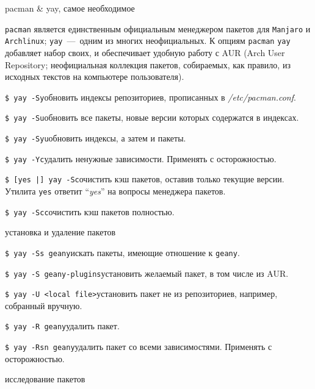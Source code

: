 \documentclass[
a4paper
,11pt
,landscape
,russian
,twocolumn
]{letter}
\newcommand\hsp{\hspace{.2in}}
\newcommand\vsp{\vspace{.2in}}
\begin{document}
\thispagestyle{empty}

\begin{Large}
	pacman \& yay, самое необходимое
\end{Large}

\vsp

\texttt{pacman} является единственным официальным менеджером пакетов для
\texttt{Manjaro} и \texttt{Archlinux}; \texttt{yay}~---~одним из многих
неофициальных.
К опциям \texttt{pacman} \texttt{yay} добавляет набор своих, и обеспечивает
удобную работу с AUR (Arch User Repository; неофициальная коллекция пакетов,
собираемых, как правило, из исходных текстов на компьютере пользователя).

\texttt{\$ yay -Sy}\hsp обновить индексы репозиториев, прописанных в
\textit{/etc/pacman.conf}.

\texttt{\$ yay -Su}\hsp обновить все пакеты, новые версии которых
содержатся в индексах.

\texttt{\$ yay -Syu}\hsp обновить индексы, а затем и пакеты.

\texttt{\$ yay -Yc}\hsp удалить ненужные зависимости. Применять
с осторожностью.

\texttt{\$ [yes |] yay -Sc}\hsp очистить кэш пакетов, оставив только
текущие версии. Утилита \texttt{yes} ответит ``\textit{yes}'' на вопросы
менеджера пакетов.

\texttt{\$ yay -Scc}\hsp очистить кэш пакетов полностью.

\vsp

\begin{Large}
	установка и удаление пакетов
\end{Large}

\vsp

\texttt{\$ yay -Ss geany}\hsp искать пакеты, имеющие отношение к
\texttt{geany}.

\texttt{\$ yay -S geany-plugins}\hsp установить желаемый пакет, в том
числе из AUR.

\texttt{\$ yay -U <local file>}\hsp установить пакет не из репозиториев,
например, собранный вручную.

\texttt{\$ yay -R geany}\hsp удалить пакет.

\texttt{\$ yay -Rsn geany}\hsp удалить пакет со всеми зависимостями.
Применять с осторожностью.

\vsp

\begin{Large}
	исследование пакетов
\end{Large}
\end{document}
